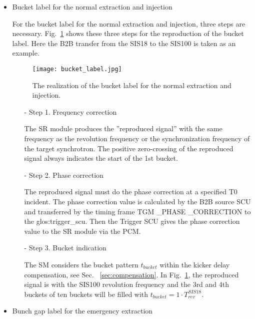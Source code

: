 \begin{itemize}
\item Bucket label for the normal extraction and injection

For the bucket label for the normal extraction and injection, three steps are necessary. Fig.~\ref{bucket_label} shows these three steps for the reproduction of the bucket label. Here the B2B transfer from the SIS18 to the SIS100 is taken as an example.
\begin{figure}[!htb]
   \centering   
   \texttt{[image: bucket\_label.jpg]}
   \caption{The realization of the bucket label for the normal extraction and injection.}
   \label{bucket_label}
\end{figure}  
\begin{itemize}
\item[-] Step 1. Frequency correction

The \gls{SR} module produces the ''reproduced signal'' with the same frequency as the revolution frequency or the synchronization frequency of the target synchrotron. The positive zero-crossing of the reproduced signal always indicates the start of the 1st bucket.
\item[-] Step 2. Phase correction

The reproduced signal must do the phase correction at a specified T0 incident. The phase correction value is calculated by the B2B source SCU and transferred by the timing frame TGM \_PHASE \_CORRECTION to the \gls{glos:trigger_scu}. Then the Trigger SCU gives the phase correction value to the SR module via the PCM.


\item[-] Step 3. Bucket indication

The SM considers the bucket pattern $t_{\mathit{bucket}}$ within the kicker delay compensation, see Sec. ~\ref{sec:compensation}. In Fig.~\ref{bucket_label}, the reproduced signal is with the SIS100 revolution frequency and the 3rd and 4th buckets of ten buckets will be filled with $t_{\mathit{bucket}}=1\cdot T_{\mathit{rev}}^{\mathit{SIS18}}$. 
\end{itemize}

\item Bunch gap label for the emergency extraction


\end{itemize}
